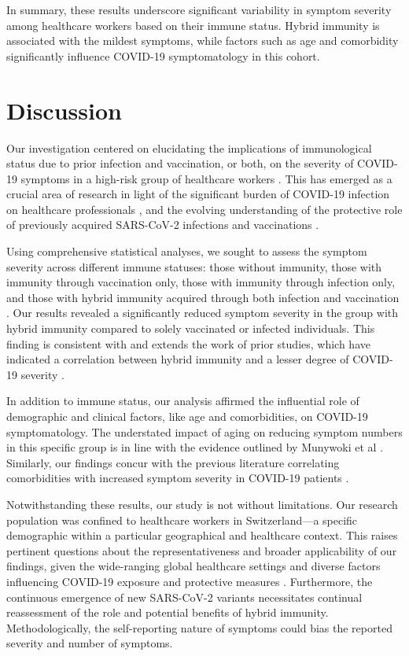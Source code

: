 \documentclass[11pt]{article}
\begin{document}
In summary, these results underscore significant variability in symptom severity among healthcare workers based on their immune status. Hybrid immunity is associated with the mildest symptoms, while factors such as age and comorbidity significantly influence COVID-19 symptomatology in this cohort.

\section*{Discussion}

Our investigation centered on elucidating the implications of immunological status due to prior infection and vaccination, or both, on the severity of COVID-19 symptoms in a high-risk group of healthcare workers \cite{Ali2020RiskAO, GmezOchoa2020COVID19IH}. This has emerged as a crucial area of research in light of the significant burden of COVID-19 infection on healthcare professionals \cite{Ali2020RiskAO}, and the evolving understanding of the protective role of previously acquired SARS-CoV-2 infections and vaccinations \cite{Huang2020ASR, Azkur2020ImmuneRT}. 

Using comprehensive statistical analyses, we sought to assess the symptom severity across different immune statuses: those without immunity, those with immunity through vaccination only, those with immunity through infection only, and those with hybrid immunity acquired through both infection and vaccination \cite{Schwarz2017AnalysisOM, Tsanas2011NonlinearSA}. Our results revealed a significantly reduced symptom severity in the group with hybrid immunity compared to solely vaccinated or infected individuals. This finding is consistent with and extends the work of prior studies, which have indicated a correlation between hybrid immunity and a lesser degree of COVID-19 severity \cite{Vishnoi2023SeverityAO, Braud2022ImpactOV}. 

In addition to immune status, our analysis affirmed the influential role of demographic and clinical factors, like age and comorbidities, on COVID-19 symptomatology. The understated impact of aging on reducing symptom numbers in this specific group is in line with the evidence outlined by Munywoki et al \cite{Munywoki2014InfluenceOA}. Similarly, our findings concur with the previous literature correlating comorbidities with increased symptom severity in COVID-19 patients \cite{Zhang2022RiskAP}.

Notwithstanding these results, our study is not without limitations. Our research population was confined to healthcare workers in Switzerland—a specific demographic within a particular geographical and healthcare context. This raises pertinent questions about the representativeness and broader applicability of our findings, given the wide-ranging global healthcare settings and diverse factors influencing COVID-19 exposure and protective measures \cite{Ali2020RiskAO, GmezOchoa2020COVID19IH}. Furthermore, the continuous emergence of new SARS-CoV-2 variants necessitates continual reassessment of the role and potential benefits of hybrid immunity. Methodologically, the self-reporting nature of symptoms could bias the reported severity and number of symptoms.
\end{document}
